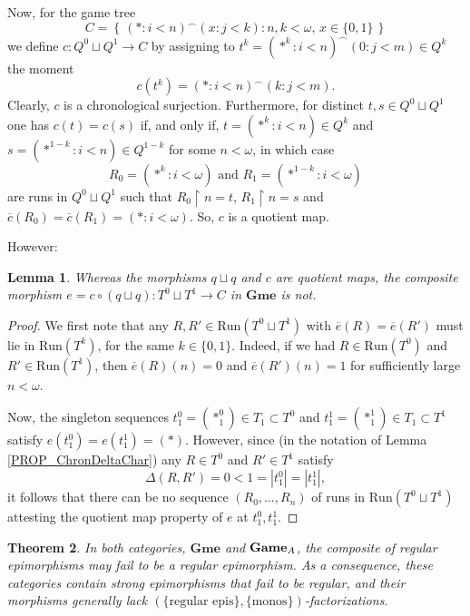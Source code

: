\documentclass[12pt]{amsart}
\newtheorem{thm}{Theorem}[section]
\newtheorem{lemma}[thm]{Lemma}
\theoremstyle{definition}
\newcommand{\set}[1]{\left\{\, {#1} \,\right\}}
\newcommand{\seq}[1]{{\left( {#1} \right)}}
\newcommand{\A}{\textup{\textmd{\textsc{A}}}}
\newcommand{\Run}{{\mathrm{Run}}}
\DeclareMathOperator{\restrict}{\upharpoonright}
\newcommand{\Games}{\mathbf{Game}}
\newcommand{\Gmes}{\mathbf{Gme}}
\begin{document}
Now, for the game tree 
\[
C = \set{\seq{*:i<n}^\smallfrown \seq{x:j<k}: n,k<\omega, \, x\in \{0,1\}}
\]
we define $c\colon Q^0\sqcup Q^1 \to C$ by assigning to $t^k=\seq{\ast^k:i<n}^\smallfrown \seq{0:j<m}\in Q^k$ the moment
\[
c(t^k) = \seq{\ast:i<n}^\smallfrown \seq{k:j<m}.
\]
Clearly, $c$ is a chronological surjection. Furthermore,
for distinct $t,s\in  Q^0\sqcup Q^1$ one has $c(t)=c(s)$ if, and only if, $t=\seq{\ast^{k}:i<n}\in Q^k$ and $s=\seq{\ast^{1-k}:i<n}\in Q^{1-k}$ for some $n<\omega$, in which case
\[
R_0 = \seq{\ast^k:i<\omega} \text{ and }
R_1 = \seq{\ast^{1-k}:i<\omega}
\]
are runs in $Q^0\sqcup Q^1$ such that $R_0\restrict n = t$, $R_1\restrict n = s$ and $\overline{c}(R_0) = \overline{c}(R_1) = \seq{\ast: i<\omega}$. So, $c$ is a quotient map.

However:
\begin{lemma}\label{LEMMA_e_not_RegEpic}
	Whereas the morphisms $q\sqcup q$ and $c$ are quotient maps, the composite morphism $e = c\circ (q\sqcup q)\colon T^0\sqcup T^1\to C$ in $\Gmes$ is not.
\end{lemma}
\begin{proof}
	We first note that any $R,R'\in \Run(T^0\sqcup T^1)$ with $\overline{e}(R) = \overline{e}(R')$ must  lie in $ \Run(T^k)$, for the same $k\in\{0,1\}$. Indeed, if we had $R\in \Run(T^0)$ and $R'\in \Run(T^1)$, then $\overline{e}(R)(n)=0$ and $\overline{e}(R')(n)=1$ for sufficiently large $n<\omega$.
	
	Now, the singleton sequences $t^0_1 = \seq{\ast_1^0}\in T_1\subset T^0$ and $t^1_1 = \seq{\ast_1^1}\in T_1\subset T^1$ satisfy $e(t^0_1)=e(t^1_1) = \seq{\ast}$. However, since  (in the notation of Lemma \ref{PROP_ChronDeltaChar}) any  $R\in T^0$ and $R'\in T^1$ satisfy
	\[
	\Delta(R,R')= 0 < 1 = |t^0_1| = |t^1_1|,
	\]
	it follows that there can be no sequence $\seq{R_0, \dotsc, R_n}$ of runs in $\Run(T^0\sqcup T^1)$ attesting the quotient map property of $e$ at $t^0_1, t^1_1$.
\end{proof}

\begin{thm}\label{THEOREM_non-regular}
	In both categories, $\Gmes$ and $\Games_{\A}$, the composite of regular epimorphisms may fail to be a regular epimorphism. As a consequence, these categories contain strong epimorphisms that fail to be regular, and their morphisms generally lack $(\{\text{regular epis}\},\{\text{monos}\})$-factorizations. 
\end{thm}
\end{document}
